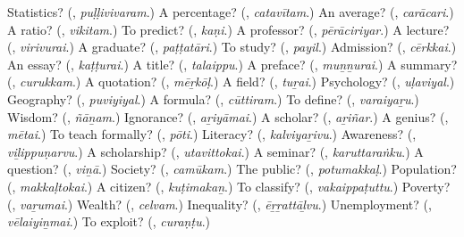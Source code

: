 \begin{tcolorbox}[breakable,colback=teal!4,colframe=teal!35!black,title={Before you move on}]
Statistics? (\textbf{}, \emph{puḷḷivivaram}.) A percentage? (\textbf{}, \emph{catavītam}.) An average? (\textbf{}, \emph{carācari}.) A ratio? (\textbf{}, \emph{vikitam}.) To predict? (\textbf{}, \emph{kaṇi}.) A professor? (\textbf{}, \emph{pērāciriyar}.) A lecture? (\textbf{}, \emph{virivurai}.) A graduate? (\textbf{}, \emph{paṭṭatāri}.) To study? (\textbf{}, \emph{payil}.) Admission? (\textbf{}, \emph{cērkkai}.) An essay? (\textbf{}, \emph{kaṭṭurai}.) A title? (\textbf{}, \emph{talaippu}.) A preface? (\textbf{}, \emph{muṉṉurai}.) A summary? (\textbf{}, \emph{curukkam}.) A quotation? (\textbf{}, \emph{mēṟkōḷ}.) A field? (\textbf{}, \emph{tuṟai}.) Psychology? (\textbf{}, \emph{uḷaviyal}.) Geography? (\textbf{}, \emph{puviyiyal}.) A formula? (\textbf{}, \emph{cūttiram}.) To define? (\textbf{}, \emph{varaiyaṟu}.) Wisdom? (\textbf{}, \emph{ñāṉam}.) Ignorance? (\textbf{}, \emph{aṟiyāmai}.) A scholar? (\textbf{}, \emph{aṟiñar}.) A genius? (\textbf{}, \emph{mētai}.) To teach formally? (\textbf{}, \emph{pōti}.) Literacy? (\textbf{}, \emph{kalviyaṟivu}.) Awareness? (\textbf{}, \emph{viḻippuṇarvu}.) A scholarship? (\textbf{}, \emph{utavittokai}.) A seminar? (\textbf{}, \emph{karuttaraṅku}.) A question? (\textbf{}, \emph{viṉā}.) Society? (\textbf{}, \emph{camūkam}.) The public? (\textbf{}, \emph{potumakkaḷ}.) Population? (\textbf{}, \emph{makkaḷtokai}.) A citizen? (\textbf{}, \emph{kuṭimakaṉ}.) To classify? (\textbf{}, \emph{vakaippaṭuttu}.) Poverty? (\textbf{}, \emph{vaṟumai}.) Wealth? (\textbf{}, \emph{celvam}.) Inequality? (\textbf{}, \emph{ēṟṟattāḻvu}.) Unemployment? (\textbf{}, \emph{vēlaiyiṉmai}.) To exploit? (\textbf{}, \emph{curaṇṭu}.)
\end{tcolorbox}
